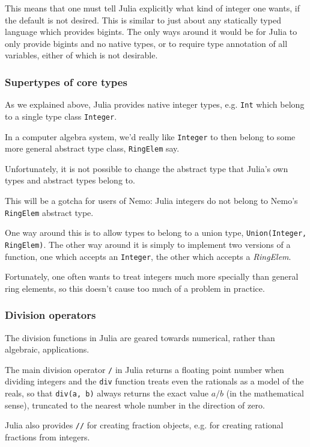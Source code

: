 \documentclass[a4paper,10pt]{article}
\newcommand{\code}{\lstinline}
\begin{document}
This means that one must tell Julia explicitly what kind of integer one wants, if the default is not
desired. This is similar to just about any statically typed language which provides bigints. The only
ways around it would be for Julia to only provide bigints and no native types, or to require type
annotation of all variables, either of which is not desirable.

\subsubsection{Supertypes of core types}

As we explained above, Julia provides native integer types, e.g. \code{Int} which belong to a single
type class \code{Integer}.

In a computer algebra system, we'd really like \code{Integer} to then belong to some more general
abstract type class, \code{RingElem} say.

Unfortunately, it is not possible to change the abstract type that Julia's own types and abstract types
belong to.

This will be a gotcha for users of Nemo: Julia integers do not belong to Nemo's \code{RingElem} abstract
type.

One way around this is to allow types to belong to a union type, \code{Union(Integer, RingElem)}. The
other way around it is simply to implement two versions of a function, one which accepts an
\code{Integer}, the other which accepts a \emph{RingElem}.

Fortunately, one often wants to treat integers much more specially than general ring elements, so this
doesn't cause too much of a problem in practice.

\subsubsection{Division operators}

The division functions in Julia are geared towards numerical, rather than algebraic, applications.

The main division operator \code{/} in Julia returns a floating point number when dividing integers
and the \code{div} function treats even the rationals as a model of the reals, so that \code{div(a, b)}
always returns the exact value $a/b$ (in the mathematical sense), truncated to the nearest whole
number in the direction of zero.

Julia also provides \code{//} for creating fraction objects, e.g. for creating rational fractions from
integers.
\end{document}

